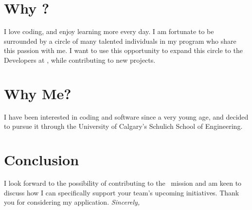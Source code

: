 \section{Why \companyName?}
I love coding, and enjoy learning more every day. I am fortunate to be surrounded by a circle of many talented individuals in my program who share this passion with me. I want to use this opportunity to expand this circle to the Developers at \companyName, while contributing to new projects.

\section{Why Me?}
I have been interested in coding and software since a very young age, and decided to pursue it through the University of Calgary’s Schulich School of Engineering. \whyMePersonalized{}

\section{Conclusion}
I look forward to the possibility of contributing to the \companyName~mission and am keen to discuss how I can specifically support your team's upcoming initiatives. Thank you for considering my application.
\newline
\newline
\large{
	\textit{Sincerely,}\\
	\userFullName
}

